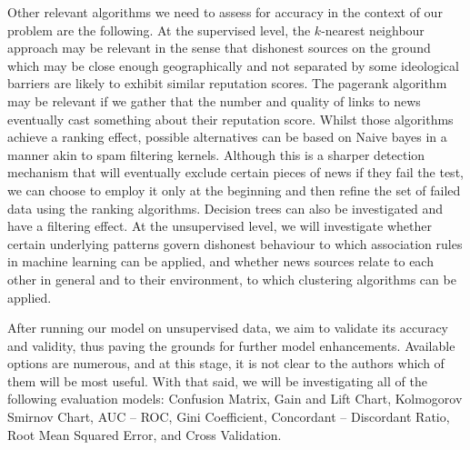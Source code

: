 Other relevant algorithms we need to assess for accuracy in the context of our problem are the following. At the supervised level, the $k$-nearest neighbour approach may be relevant in the sense that dishonest sources on the ground which may be close enough geographically and not separated by some ideological barriers are likely to exhibit similar reputation scores. The pagerank algorithm may be relevant if we gather that the number and quality of links to news eventually cast something about their reputation score. Whilst those algorithms achieve a ranking effect, possible alternatives can be based on Naive bayes in a manner akin to spam filtering kernels. Although this is a sharper detection mechanism that will eventually exclude certain pieces of news if they fail the test, we can choose to employ it only at the beginning and then refine the set of failed data using the ranking algorithms. Decision trees can also be investigated and have a filtering effect. At the unsupervised level, we will investigate whether certain underlying patterns govern dishonest behaviour to which association rules in machine learning can be applied, and whether news sources relate to each other in general and to their environment, to which clustering algorithms can be applied. 


After running our model on unsupervised data, we aim to validate its accuracy and validity, thus paving the grounds for further model enhancements. Available options are numerous, and at this stage, it is not clear to the authors which of them will be most useful. With that said, we will be investigating all of the following evaluation models: Confusion Matrix, Gain and Lift Chart, Kolmogorov Smirnov Chart, AUC – ROC, Gini Coefficient, Concordant – Discordant Ratio, Root Mean Squared Error, and Cross Validation.
